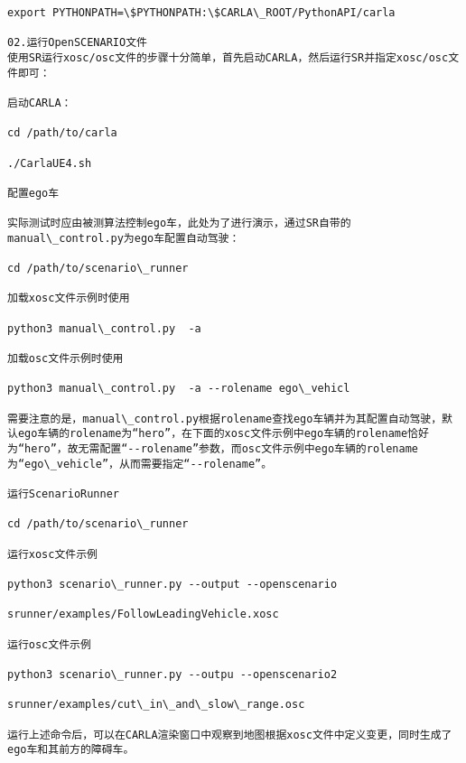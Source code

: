 \begin{lstlisting}
export PYTHONPATH=\$PYTHONPATH:\$CARLA\_ROOT/PythonAPI/carla
		
02.运行OpenSCENARIO文件
使用SR运行xosc/osc文件的步骤十分简单，首先启动CARLA，然后运行SR并指定xosc/osc文件即可：
		
启动CARLA：
		
cd /path/to/carla
		
./CarlaUE4.sh
		
配置ego车
		
实际测试时应由被测算法控制ego车，此处为了进行演示，通过SR自带的manual\_control.py为ego车配置自动驾驶：
		
cd /path/to/scenario\_runner
		
加载xosc文件示例时使用
		
python3 manual\_control.py  -a
		
加载osc文件示例时使用
		
python3 manual\_control.py  -a --rolename ego\_vehicl
		
需要注意的是，manual\_control.py根据rolename查找ego车辆并为其配置自动驾驶，默认ego车辆的rolename为“hero”，在下面的xosc文件示例中ego车辆的rolename恰好为“hero”，故无需配置“--rolename”参数，而osc文件示例中ego车辆的rolename为“ego\_vehicle”，从而需要指定“--rolename”。
		
运行ScenarioRunner
		
cd /path/to/scenario\_runner
		
运行xosc文件示例
		
python3 scenario\_runner.py --output --openscenario
		
srunner/examples/FollowLeadingVehicle.xosc
		
运行osc文件示例
		
python3 scenario\_runner.py --outpu --openscenario2
		
srunner/examples/cut\_in\_and\_slow\_range.osc
		
运行上述命令后，可以在CARLA渲染窗口中观察到地图根据xosc文件中定义变更，同时生成了ego车和其前方的障碍车。
		
\end{lstlisting}
	
	
